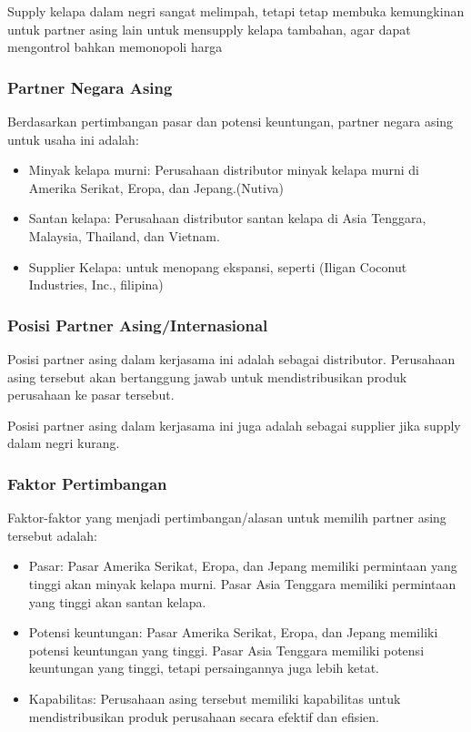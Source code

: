 \documentclass[12pt]{article}
\begin{document}
Supply kelapa dalam negri sangat melimpah, tetapi tetap membuka kemungkinan untuk partner asing lain untuk mensupply kelapa tambahan, agar dapat mengontrol bahkan memonopoli harga

\subsubsection*{Partner Negara Asing}

Berdasarkan pertimbangan pasar dan potensi keuntungan, partner negara asing untuk usaha ini adalah:
\begin{itemize}
  
  \item Minyak kelapa murni: Perusahaan distributor minyak kelapa murni di Amerika Serikat, Eropa, dan Jepang.(Nutiva)
  \item Santan kelapa: Perusahaan distributor santan kelapa di Asia Tenggara, Malaysia, Thailand, dan Vietnam.
  \item Supplier Kelapa: untuk menopang ekspansi, seperti (Iligan Coconut Industries, Inc., filipina)
\end{itemize}

\subsubsection*{Posisi Partner Asing/Internasional}

Posisi partner asing dalam kerjasama ini adalah sebagai distributor. Perusahaan asing tersebut akan bertanggung jawab untuk mendistribusikan produk perusahaan ke pasar tersebut.

Posisi partner asing dalam kerjasama ini juga adalah sebagai supplier jika supply dalam negri kurang.

\subsubsection*{Faktor Pertimbangan}

Faktor-faktor yang menjadi pertimbangan/alasan untuk memilih partner asing tersebut adalah:
\begin{itemize}
  
  \item Pasar: Pasar Amerika Serikat, Eropa, dan Jepang memiliki permintaan yang tinggi akan minyak kelapa murni. Pasar Asia Tenggara memiliki permintaan yang tinggi akan santan kelapa.
  \item Potensi keuntungan: Pasar Amerika Serikat, Eropa, dan Jepang memiliki potensi keuntungan yang tinggi. Pasar Asia Tenggara memiliki potensi keuntungan yang tinggi, tetapi persaingannya juga lebih ketat.
  \item Kapabilitas: Perusahaan asing tersebut memiliki kapabilitas untuk mendistribusikan produk perusahaan secara efektif dan efisien.
\end{itemize}
\end{document}

